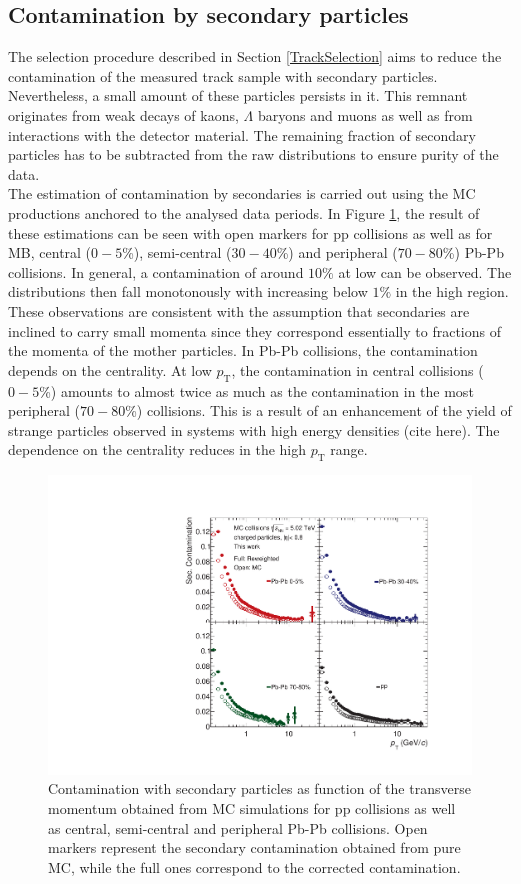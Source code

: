 \documentclass[12pt,a4paper]{report}
\begin{document}
\subsection{Contamination by secondary particles}
The selection procedure described in Section \ref{TrackSelection} aims to reduce the contamination of the measured track sample with secondary particles. Nevertheless, a small amount of these particles persists in it. This remnant originates from weak decays of kaons, $\Lambda$ baryons and muons as well as from interactions with the detector material. The remaining fraction of secondary particles has to be subtracted from the raw \pt distributions to ensure purity of the data.\\
The estimation of contamination by secondaries is carried out using the MC productions anchored to the analysed data periods. In Figure \ref{SecCont}, the result of these estimations can be seen with open markers for pp collisions as well as for MB, central ($0-5$\%), semi-central ($30-40$\%) and peripheral ($70-80$\%) Pb-Pb collisions. In general, a contamination of around  $10\%$ at low \pt can be observed. The distributions then fall monotonously with increasing \pt below $1\%$ in the high \pt region. These observations are consistent with the assumption that secondaries are inclined to carry small momenta since they correspond essentially to fractions of the momenta of the mother particles. In Pb-Pb collisions, the contamination depends on the centrality. At low $p_\text{T}$, the contamination in central collisions ($0-5$\%) amounts to almost twice as much as the contamination in the most peripheral ($70-80$\%) collisions. This is a result of an enhancement of the yield of strange particles observed in systems with high energy densities (cite here). The dependence on the centrality reduces in the high $p_\text{T}$ range.
\begin{figure}[tb!]
\centering
\includegraphics[width=12cm]{Plots/secCont.pdf}  
\caption{Contamination with secondary particles as function of the transverse momentum obtained from MC simulations for pp collisions as well as central, semi-central and peripheral Pb-Pb collisions. Open markers represent the secondary contamination obtained from pure MC, while the full ones correspond to the  corrected contamination.}
\label{SecCont}
\end{figure}
\end{document}
